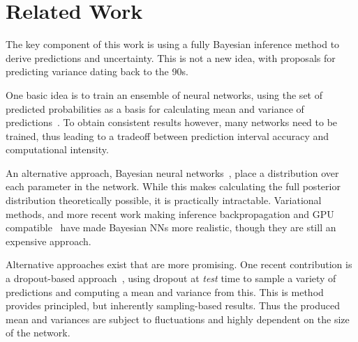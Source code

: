 \documentclass{article}
\begin{document}
  
 



\section{Related Work}


The key component of this work is using a fully Bayesian inference method to derive predictions and uncertainty. This is not a new idea, with proposals for predicting variance dating back to the 90s.

One basic idea is to train an ensemble of neural networks, using the set of predicted probabilities as a basis for calculating mean and variance of predictions~\cite{paass1993assessing}. To obtain consistent results however, many networks need to be trained, thus leading to a tradeoff between prediction interval accuracy and computational intensity.

An alternative approach, Bayesian neural networks~\cite{mackay1992practical}, place a distribution over each parameter in the network. While this makes calculating the full posterior distribution theoretically possible, it is practically intractable. Variational methods, and more recent work making inference backpropagation and GPU compatible~\cite{blundell2015weight} have made Bayesian NNs more realistic, though they are still an expensive approach. 

Alternative approaches exist that are more promising. One recent contribution is a dropout-based approach~\cite{gal2016dropout}, using dropout at \textit{test} time to sample a variety of predictions and computing a mean and variance from this. This is method provides principled, but inherently sampling-based results. Thus the produced mean and variances are subject to fluctuations and highly dependent on the size of the network.
\end{document}
